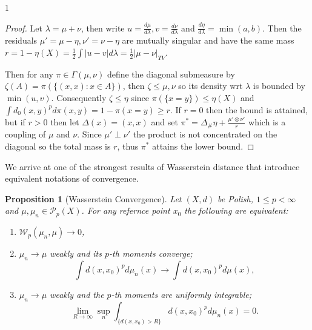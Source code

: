 \documentclass[12pt]{article}
\newtheorem{proposition}[theorem]{Proposition}
\theoremstyle{definition}
\theoremstyle{plain}
\begin{document}
\begin{spacing}{1}
{\begin{proof}
    Let $\lambda = \mu + \nu$, then write $u = \frac{d\mu}{d\lambda}, v = \frac{d\nu}{d\lambda}$ and $\frac{d\eta}{d\lambda} = \min(a, b)$. Then the residuals $\mu' = \mu - \eta, \nu' = \nu - \eta$ are mutually singular and have the same mass $r = 1 - \eta(X) = \frac{1}{2} \displaystyle \int \lvert u - v \rvert d\lambda = \frac{1}{2} \lvert \mu - \nu \rvert_{TV}$.

    Then for any $\pi \in \Gamma(\mu, \nu)$ define the diagonal submeasure by $\zeta(A) = \pi(\{(x, x): x \in A\})$, then $\zeta \leq \mu, \nu$ so its density wrt $\lambda$ is bounded by $\min(u, v)$. Consequently $\zeta \leq \eta$ since $\pi(\{x = y\}) \leq \eta(X)$ and $\displaystyle \int d_0(x, y)^p d\pi(x, y) = 1 - \pi({x = y}) \geq r$. If $r = 0$ then the bound is attained, but if $r > 0$ then let $\Delta(x) = (x,x)$ and set $\pi^* = \Delta_\# \eta + \frac{\mu' \otimes \nu'}{r}$ which is a coupling of $\mu$ and $\nu$. Since $\mu' \perp \nu'$ the product is not concentrated on the diagonal so the total mass is $r$, thus $\pi^*$ attains the lower bound.
\end{proof}

We arrive at one of the strongest results of Wasserstein distance that introduce equivalent notations of convergence.

\begin{proposition}[Wasserstein Convergence]
    Let $(X, d)$ be Polish, $1 \leq p < \infty$ and $\mu, \mu_n \in \mathcal{P}_p(X)$. For any refernce point $x_0$ the following are equivalent:
    \begin{enumerate}
        \item $\mathcal{W}_p(\mu_n, \mu) \rightarrow 0$,
        \item $\mu_n \rightarrow \mu$ weakly and its $p$-th moments converge;
        \[
        \displaystyle \int d(x, x_0)^p d\mu_n(x) \rightarrow \int d(x, x_0)^p d\mu(x),
        \]
        \item $\mu_n \rightarrow \mu$ weakly and the $p$-th moments are uniformly integrable;
        \[
        \lim_{R \rightarrow \infty} \sup_n \displaystyle \int_{\{d(x, x_0) > R\}} d(x, x_0)^p d\mu_n(x) = 0.
        \]
    \end{enumerate}
\end{proposition}

}
\end{spacing}
\end{document}
